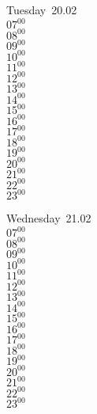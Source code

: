 \documentclass[11pt, a4paper]{book}\usepackage[]{graphicx}\usepackage[]{color}
\begin{document}
\begin{weekdaybox}
  Tuesday~20.02\\
  { 
  \vfill
  $07^{00}$\\
$08^{00}$\\
$09^{00}$\\
$10^{00}$\\
$11^{00}$\\
$12^{00}$\\
$13^{00}$\\
$14^{00}$\\
$15^{00}$\\
$16^{00}$\\
$17^{00}$\\
$18^{00}$\\
$19^{00}$\\
$20^{00}$\\
$21^{00}$\\
$22^{00}$\\
$23^{00}$\\
  }
\end{weekdaybox}
\begin{weekdaybox}
  Wednesday~21.02\\
  { 
  \vfill
  $07^{00}$\\
$08^{00}$\\
$09^{00}$\\
$10^{00}$\\
$11^{00}$\\
$12^{00}$\\
$13^{00}$\\
$14^{00}$\\
$15^{00}$\\
$16^{00}$\\
$17^{00}$\\
$18^{00}$\\
$19^{00}$\\
$20^{00}$\\
$21^{00}$\\
$22^{00}$\\
$23^{00}$\\
  }
\end{weekdaybox}
\clearpage
\begin{headerbox}
\end{headerbox}
\end{document}
